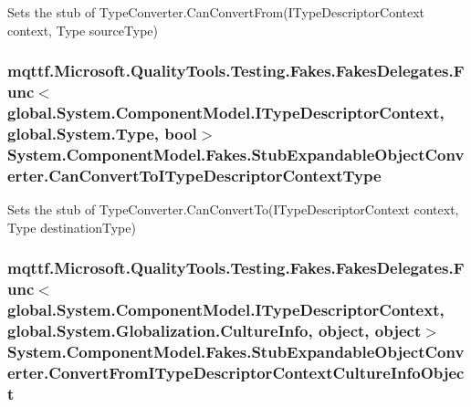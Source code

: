 Sets the stub of Type\-Converter.\-Can\-Convert\-From(\-I\-Type\-Descriptor\-Context context, Type source\-Type)

\hypertarget{class_system_1_1_component_model_1_1_fakes_1_1_stub_expandable_object_converter_a982dff5369044dd43868c34cb5c345c7}{
\subsubsection[{Can\-Convert\-To\-I\-Type\-Descriptor\-Context\-Type}]{\setlength{\rightskip}{0pt plus 5cm}mqttf.\-Microsoft.\-Quality\-Tools.\-Testing.\-Fakes.\-Fakes\-Delegates.\-Func$<$global.\-System.\-Component\-Model.\-I\-Type\-Descriptor\-Context, global.\-System.\-Type, bool$>$ System.\-Component\-Model.\-Fakes.\-Stub\-Expandable\-Object\-Converter.\-Can\-Convert\-To\-I\-Type\-Descriptor\-Context\-Type}}\label{class_system_1_1_component_model_1_1_fakes_1_1_stub_expandable_object_converter_a982dff5369044dd43868c34cb5c345c7}


Sets the stub of Type\-Converter.\-Can\-Convert\-To(\-I\-Type\-Descriptor\-Context context, Type destination\-Type)

\hypertarget{class_system_1_1_component_model_1_1_fakes_1_1_stub_expandable_object_converter_af3e3487b168310455503c0df176be83f}{
\subsubsection[{Convert\-From\-I\-Type\-Descriptor\-Context\-Culture\-Info\-Object}]{\setlength{\rightskip}{0pt plus 5cm}mqttf.\-Microsoft.\-Quality\-Tools.\-Testing.\-Fakes.\-Fakes\-Delegates.\-Func$<$global.\-System.\-Component\-Model.\-I\-Type\-Descriptor\-Context, global.\-System.\-Globalization.\-Culture\-Info, object, object$>$ System.\-Component\-Model.\-Fakes.\-Stub\-Expandable\-Object\-Converter.\-Convert\-From\-I\-Type\-Descriptor\-Context\-Culture\-Info\-Object}}\label{class_system_1_1_component_model_1_1_fakes_1_1_stub_expandable_object_converter_af3e3487b168310455503c0df176be83f}


